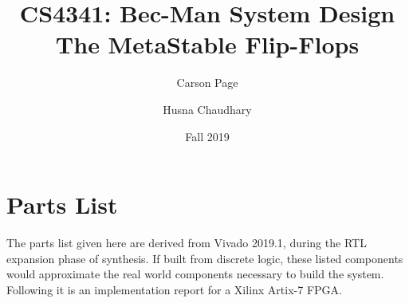\documentclass[12pt]{article}
\title{
    CS4341: Bec-Man System Design \\
    \large The MetaStable Flip-Flops}
\author{Carson Page \and Husna Chaudhary}
\date{Fall 2019}
\begin{document}
\begin{titlepage}
    \maketitle
\end{titlepage}
\tableofcontents
\cleardoublepage
\listoftables
\listoffigures
\newpage

\setlength{\parskip}{0.5em}

\section{Parts List}
The parts list given here are derived from Vivado 2019.1, during the RTL
expansion phase of synthesis. If built from discrete logic, these listed
components would approximate the real world components necessary to build the
system. Following it is an implementation report for a Xilinx Artix-7 FPGA.
\end{document}
